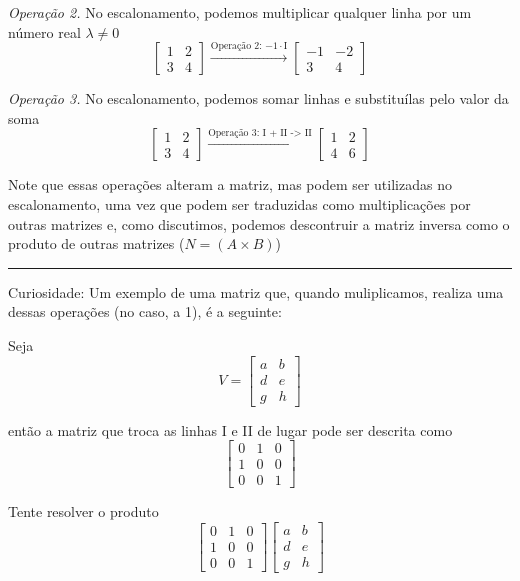 \documentclass[
  portuguese,
  letterpaper,
  DIV=11,
  numbers=noendperiod]{scrreport}
\begin{document}
\emph{Operação 2.} No escalonamento, podemos multiplicar qualquer linha
por um número real \(\lambda \neq 0\) \[
\begin{bmatrix}
    1 & 2 \\
    3 & 4
\end{bmatrix} \stackrel{\text{Operação 2: $-1\cdot$I}}{\rightarrow}
\begin{bmatrix}
    -1 & -2 \\
    3& 4
\end{bmatrix}
\]

\emph{Operação 3.} No escalonamento, podemos somar linhas e substituílas
pelo valor da soma \[
\begin{bmatrix}
    1 & 2 \\
    3 & 4
\end{bmatrix} \stackrel{\text{Operação 3: I + II -> II}}{\rightarrow}
\begin{bmatrix}
    1 & 2 \\
    4 & 6
\end{bmatrix}
\]

Note que essas operações alteram a matriz, mas podem ser utilizadas no
escalonamento, uma vez que podem ser traduzidas como multiplicações por
outras matrizes e, como discutimos, podemos descontruir a matriz inversa
como o produto de outras matrizes (\(N=(A\times B)\))

\begin{center}\rule{0.5\linewidth}{0.5pt}\end{center}

Curiosidade: Um exemplo de uma matriz que, quando muliplicamos, realiza
uma dessas operações (no caso, a 1), é a seguinte:

Seja \[
V = \begin{bmatrix}
    a & b \\
    d & e \\
    g & h
\end{bmatrix}
\]

então a matriz que troca as linhas I e II de lugar pode ser descrita
como \[
\begin{bmatrix}
    0 & 1 & 0\\
    1 & 0 & 0\\
    0 & 0 & 1
\end{bmatrix}
\]

Tente resolver o produto \[
\begin{bmatrix}
    0 & 1 & 0\\
    1 & 0 & 0\\
    0 & 0 & 1
\end{bmatrix} 
\begin{bmatrix}
    a & b \\
    d & e \\
    g & h
\end{bmatrix}
\]
\end{document}
